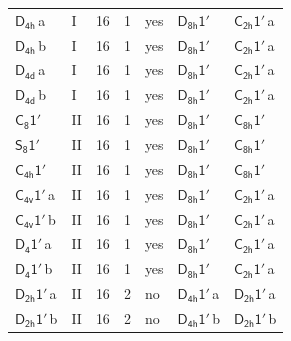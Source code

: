 \documentclass[10pt,a4paper]{article}
\numberwithin{equation}{section}
\newcommand{\grp}[1]{\mathsf{#1}}
\newcommand{\clsletter}[1]{\,{\scriptsize\color{black!55}#1}}
\begin{document}
{\begin{longtable}{@{}llrrlll@{}}
\href{../../../rotation/data/pdf/D4h.pdf}{$\grp{D_{4h}}$}\clsletter{a} & I & 16 & 1 & yes & \href{D8h-1p.pdf}{$\grp{D_{8h}1'}$} & \href{C2h-1p.pdf}{$\grp{C_{2h}1'}$}\clsletter{a}\\
\href{../../../rotation/data/pdf/D4h.pdf}{$\grp{D_{4h}}$}\clsletter{b} & I & 16 & 1 & yes & \href{D8h-1p.pdf}{$\grp{D_{8h}1'}$} & \href{C2h-1p.pdf}{$\grp{C_{2h}1'}$}\clsletter{a}\\
\href{../../../rotation/data/pdf/D4d.pdf}{$\grp{D_{4d}}$}\clsletter{a} & I & 16 & 1 & yes & \href{D8h-1p.pdf}{$\grp{D_{8h}1'}$} & \href{C2h-1p.pdf}{$\grp{C_{2h}1'}$}\clsletter{a}\\
\href{../../../rotation/data/pdf/D4d.pdf}{$\grp{D_{4d}}$}\clsletter{b} & I & 16 & 1 & yes & \href{D8h-1p.pdf}{$\grp{D_{8h}1'}$} & \href{C2h-1p.pdf}{$\grp{C_{2h}1'}$}\clsletter{a}\\
\href{C8-1p.pdf}{$\grp{C_{8}1'}$} & II & 16 & 1 & yes & \href{D8h-1p.pdf}{$\grp{D_{8h}1'}$} & \href{C8h-1p.pdf}{$\grp{C_{8h}1'}$}\\
\href{S8-1p.pdf}{$\grp{S_{8}1'}$} & II & 16 & 1 & yes & \href{D8h-1p.pdf}{$\grp{D_{8h}1'}$} & \href{C8h-1p.pdf}{$\grp{C_{8h}1'}$}\\
\href{C4h-1p.pdf}{$\grp{C_{4h}1'}$} & II & 16 & 1 & yes & \href{D8h-1p.pdf}{$\grp{D_{8h}1'}$} & \href{C8h-1p.pdf}{$\grp{C_{8h}1'}$}\\
\href{C4v-1p.pdf}{$\grp{C_{4v}1'}$}\clsletter{a} & II & 16 & 1 & yes & \href{D8h-1p.pdf}{$\grp{D_{8h}1'}$} & \href{C2h-1p.pdf}{$\grp{C_{2h}1'}$}\clsletter{a}\\
\href{C4v-1p.pdf}{$\grp{C_{4v}1'}$}\clsletter{b} & II & 16 & 1 & yes & \href{D8h-1p.pdf}{$\grp{D_{8h}1'}$} & \href{C2h-1p.pdf}{$\grp{C_{2h}1'}$}\clsletter{a}\\
\href{D4-1p.pdf}{$\grp{D_{4}1'}$}\clsletter{a} & II & 16 & 1 & yes & \href{D8h-1p.pdf}{$\grp{D_{8h}1'}$} & \href{C2h-1p.pdf}{$\grp{C_{2h}1'}$}\clsletter{a}\\
\href{D4-1p.pdf}{$\grp{D_{4}1'}$}\clsletter{b} & II & 16 & 1 & yes & \href{D8h-1p.pdf}{$\grp{D_{8h}1'}$} & \href{C2h-1p.pdf}{$\grp{C_{2h}1'}$}\clsletter{a}\\
\href{D2h-1p.pdf}{$\grp{D_{2h}1'}$}\clsletter{a} & II & 16 & 2 & no & \href{D4h-1p.pdf}{$\grp{D_{4h}1'}$}\clsletter{a} & \href{D2h-1p.pdf}{$\grp{D_{2h}1'}$}\clsletter{a}\\
\href{D2h-1p.pdf}{$\grp{D_{2h}1'}$}\clsletter{b} & II & 16 & 2 & no & \href{D4h-1p.pdf}{$\grp{D_{4h}1'}$}\clsletter{b} & \href{D2h-1p.pdf}{$\grp{D_{2h}1'}$}\clsletter{b}\\

\end{longtable}}
\end{document}
